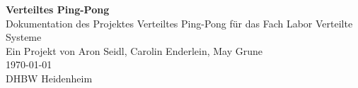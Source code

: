 \begin{titlepage}
	\centering
	{\Huge \bfseries Verteiltes Ping-Pong\\[3.5cm]}
	{\Large Dokumentation des Projektes Verteiltes Ping-Pong für das Fach Labor Verteilte Systeme  \\[1.5cm]}
	{\Large Ein Projekt von Aron Seidl, Carolin Enderlein, May Grune\\[2.5cm]}
	{\Large \today\\[2cm]}
	{\Large DHBW Heidenheim}
	\vfill
\end{titlepage}